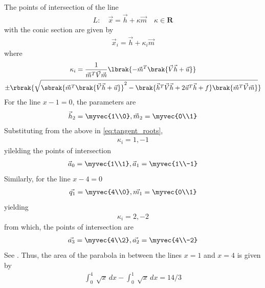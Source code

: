 The points of intersection of the line 
\begin{align}
	L: \quad \vec{x} = \vec{h} + \kappa \vec{m} \quad \kappa \in \mathbf{R}
\label{eq:conic_tangent}
\end{align}
with the conic section are given by
\begin{align}
\vec{x}_i = \vec{h} + \kappa_i \vec{m}
\label{eq:conic_tangent_pts}
\end{align}
%
where
{\tiny
\begin{multline}
\kappa_i = \frac{1}
{
\vec{m}^T\vec{V}\vec{m}
}
\lbrak{-\vec{m}^T\brak{\vec{V}\vec{h}+\vec{u}}}
\\
\pm
\rbrak{\sqrt{
\sbrak{
\vec{m}^T\brak{\vec{V}\vec{h}+\vec{u}}
}^2
-
\brak
{
\vec{h}^T\vec{V}\vec{h} + 2\vec{u}^T\vec{h} +f
}
\brak{\vec{m}^T\vec{V}\vec{m}}
}
}
\label{eq:tangent_roots}
\end{multline}
}
\fi
For the line $x-1=0$, the parameters are  
\begin{align}
	\vec{h}_2=\myvec{1\\0},
	\vec{m}_2=\myvec{0\\1}
\end{align}
Substituting from the above in 
\eqref{eq:tangent_roots},
\begin{align}
\kappa_i=1,-1
\end{align}
yilelding 
the points of intersection 
\begin{align}
	\vec{a}_0=\myvec{1\\1},
	\vec{a}_1=\myvec{1\\-1}
\end{align}
Similarly, 
for the line $x-4=0$ 
\begin{align}
\vec{q_1}=\myvec{4\\0},
\vec{m_1}=\myvec{0\\1}
\end{align}
yielding
\begin{align}
\kappa_i=2,-2
\end{align}
from which, the points of 
intersection are
\begin{align}
\vec{a_3}=\myvec{4\\2},
\vec{a_2}=\myvec{4\\-2}
\end{align}
		See .
Thus, 
the area of the parabola in between the lines $x=1$ and $x=4$ is given by
\begin{align}
\int_{0}^{4} \ \sqrt{x} \,dx-\int_{0}^{1} \ \sqrt{x} \,dx
=14/3
\end{align}
